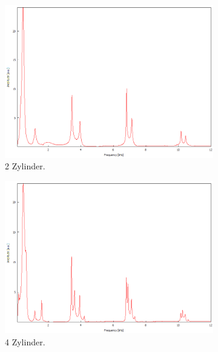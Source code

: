\begin{figure}
    \centering
    \begin{subfigure}[b]{0.3\textwidth}
        \centering
        \includegraphics[width=\textwidth]{data/4_2/10mm_2zylinder.png}
        \caption{2 Zylinder.}
    \end{subfigure}
    \hfill
    \begin{subfigure}[b]{0.3\textwidth}
        \centering
        \includegraphics[width=\textwidth]{data/4_2/10mm_4zylidner.png}
        \caption{4 Zylinder.}
    \end{subfigure}
    \hfill
    \begin{subfigure}[b]{0.3\textwidth}
        \centering

\end{subfigure}
\end{figure}
